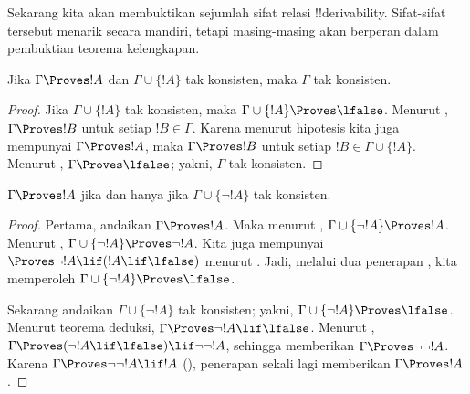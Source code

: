 \documentclass[../../../include/open-logic-section]{subfiles}
\begin{document}
      {}
      {}


Sekarang kita akan membuktikan sejumlah sifat relasi !!{derivability}.
Sifat-sifat tersebut menarik secara mandiri, tetapi masing-masing akan
berperan dalam pembuktian teorema kelengkapan.

\begin{prop}
  Jika $\Gamma \Proves !A$ dan $\Gamma \cup \{!A\}$ tak konsisten,
  maka $\Gamma$ tak konsisten.
\end{prop}

\begin{proof}
  Jika $\Gamma \cup \{!A\}$ tak konsisten, maka
  $\Gamma \cup \{!A\} \Proves \lfalse$. Menurut
  , $\Gamma \Proves !B$ untuk setiap
  $!B \in \Gamma$. Karena menurut hipotesis kita juga mempunyai
  $\Gamma \Proves !A$, maka $\Gamma \Proves !B$ untuk setiap
  $!B \in \Gamma \cup \{!A\}$. Menurut
  , $\Gamma \Proves \lfalse$; yakni,
  $\Gamma$ tak konsisten.
\end{proof}

\begin{prop}
$\Gamma \Proves !A$ jika dan hanya jika $\Gamma \cup \{\lnot !A\}$
tak konsisten.
\end{prop}

\begin{proof}
Pertama, andaikan $\Gamma \Proves !A$. Maka menurut
,
$\Gamma \cup \{\lnot !A\} \Proves !A$. Menurut
,
$\Gamma \cup \{\lnot !A\} \Proves \lnot !A$. Kita juga mempunyai
$\Proves \lnot !A \lif (!A \lif \lfalse)$ menurut
. Jadi, melalui dua penerapan
, kita memperoleh
$\Gamma \cup \{\lnot !A\} \Proves \lfalse$.

Sekarang andaikan $\Gamma \cup \{\lnot !A\}$ tak konsisten; yakni,
$\Gamma \cup \{\lnot !A\} \Proves \lfalse$. Menurut teorema deduksi,
$\Gamma \Proves \lnot !A \lif \lfalse$. Menurut
,
$\Gamma \Proves (\lnot !A \lif \lfalse) \lif \lnot\lnot !A$,
sehingga  memberikan
$\Gamma \Proves \lnot\lnot !A$. Karena
$\Gamma \Proves \lnot\lnot !A \lif !A$
(), penerapan  sekali lagi
memberikan $\Gamma \Proves !A$.
\end{proof}
\end{document}
